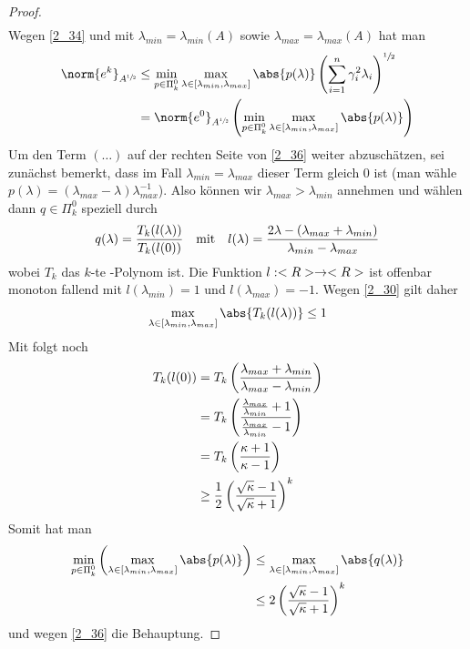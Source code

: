 \begin{proof}
\begin{align}
	\end{align}
	Wegen \cref{2_34} und mit $\lambda_{min}=\lambda_{min}(A)$ sowie $\lambda_{max}=\lambda_{max}(A)$ hat man
	\begin{align}
		\label{2_36}
		\begin{split}
			\norm{e^k}_{A^{\sfrac{1}{2}}} &\le \min_{p\in\Pi^0_k}\max_{\lambda\in[\lambda_{min},\lambda_{max}]}\abs{p(\lambda)}\left(\sum_{i=1}^n\gamma_i^2\lambda_i\right)^{\sfrac{1}{2}}  \\
			&=\norm{e^0}_{A^{\sfrac{1}{2}}}\left(\min_{p\in\Pi^0_k}\max_{\lambda\in[\lambda_{min},\lambda_{max}]}\abs{p(\lambda)}\right) 
		\end{split}
	\end{align}
	Um den Term $(\dots)$ auf der rechten Seite von \cref{2_36} weiter abzuschätzen, sei zunächst bemerkt, dass im Fall $\lambda_{min}=\lambda_{max}$ dieser Term gleich 0 ist (man wähle $p(\lambda)=(\lambda_{max} - \lambda)\lambda_{max}^{-1}$). Also können wir $\lambda_{max}>\lambda_{min}$ annehmen und wählen dann $q\in\Pi_k^0$ speziell durch
	\begin{align}
		q(\lambda) = \frac{T_k(l(\lambda))}{T_k(l(0))}\quad\text{mit}\quad l(\lambda) = \frac{2\lambda-(\lambda_{max}+\lambda_{min})}{\lambda_{min}-\lambda_{max}}\notag
	\end{align}
	wobei $T_k$ das $k$-te -Polynom ist. Die Funktion $l:<R>\to<R>$ ist offenbar monoton fallend mit $l(\lambda_{min})=1$ und $l(\lambda_{max})=-1$. Wegen \cref{2_30} gilt daher
	\begin{align}
		\max_{\lambda\in[\lambda_{min},\lambda_{max}]}\abs{T_k(l(\lambda))}\le 1\notag
	\end{align}
	Mit  folgt noch
	\begin{align}
		T_k(l(0)) &= T_k\left(\frac{\lambda_{max}+\lambda_{min}}{\lambda_{max}-\lambda_{min}}\right) \notag \\
		&= T_k\left(\frac{\frac{\lambda_{max}}{\lambda_{min}}+1}{\frac{\lambda_{max}}{\lambda_{min}}-1}\right) \notag \\
		&= T_k\left(\frac{\kappa+1}{\kappa-1}\right) \notag \\
		&\ge \frac{1}{2}\left(\frac{\sqrt{\kappa}-1}{\sqrt{\kappa}+1}\right)^k\notag
	\end{align}
	Somit hat man
	\begin{align}
		\min_{p\in\Pi^0_k}\left(\max_{\lambda\in[\lambda_{min},\lambda_{max}]}\abs{p(\lambda)}\right) &\le \max_{\lambda\in[\lambda_{min},\lambda_{max}]}\abs{q(\lambda)} \notag \\
		&\le 2\left(\frac{\sqrt{\kappa}-1}{\sqrt{\kappa}+1}\right)^k\notag
	\end{align}
	und wegen \cref{2_36} die Behauptung.
\end{proof}

